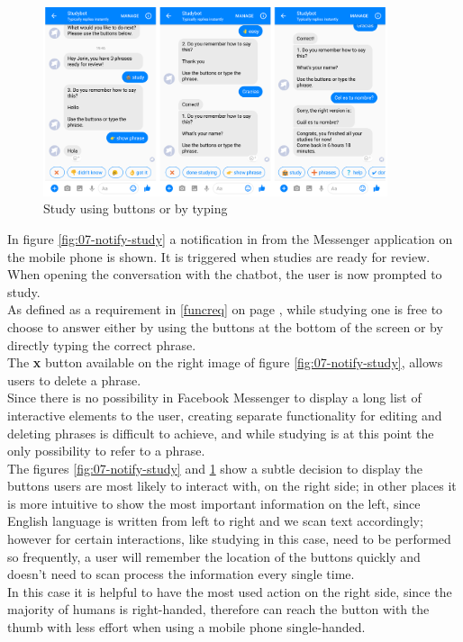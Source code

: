 \begin{figure}[h]
  \centering
  \includegraphics[width=0.9\textwidth]{images/interface/08-study-done.png}
	\caption{Study using buttons or by typing}
	\label{fig:08-study-done}
\end{figure}

In figure \ref{fig:07-notify-study} a notification in from the Messenger application on the mobile phone is shown.
It is triggered when studies are ready for review.
\\
When opening the conversation with the chatbot,
the user is now prompted to study.
\\
As defined as a requirement in \ref{funcreq} on page \pageref{funcreq},
while studying one is free to choose to answer either by using the buttons at the bottom of the screen
or by directly typing the correct phrase.
\\

The \textbf{x} button available on the right image of figure \ref{fig:07-notify-study},
allows users to delete a phrase.
\\
Since there is no possibility in Facebook Messenger to display a long list of interactive elements to the user,
creating separate functionality for editing and deleting phrases is difficult to achieve,
and while studying is at this point the only possibility to refer to a phrase.
\\

The figures \ref{fig:07-notify-study} and \ref{fig:08-study-done} show a subtle decision to display the buttons users are most likely to interact with,
on the right side;
in other places it is more intuitive to show the most important information on the left,
since English language is written from left to right and we scan text accordingly;
however for certain interactions, like studying in this case, need to be performed so frequently,
a user will remember the location of the buttons quickly and doesn't need to scan process the information every single time.
\\
In this case it is helpful to have the most used action on the right side, since the majority of humans is right-handed,
therefore can reach the button with the thumb with less effort when using a mobile phone single-handed.
\\

